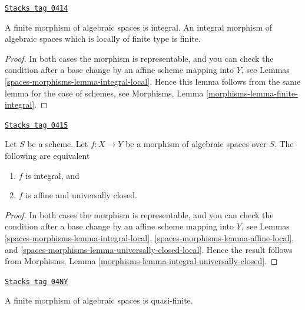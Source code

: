 \begin{lemma}
\label{spaces-morphisms-lemma-finite-integral}
\href{https://stacks.math.columbia.edu/tag/0414}{\texttt{Stacks tag 0414}}

A finite morphism of algebraic spaces is integral.
An integral morphism of algebraic spaces
which is locally of finite type is finite.
\end{lemma}

\begin{proof}
In both cases the morphism is representable, and you can check the condition
after a base change by an affine scheme mapping into $Y$, see
Lemmas \ref{spaces-morphisms-lemma-integral-local}. Hence this lemma follows from the
same lemma for the case of schemes, see
Morphisms, Lemma \ref{morphisms-lemma-finite-integral}.
\end{proof}

\begin{lemma}
\label{spaces-morphisms-lemma-integral-universally-closed}
\href{https://stacks.math.columbia.edu/tag/0415}{\texttt{Stacks tag 0415}}

Let $S$ be a scheme.
Let $f : X \to Y$ be a morphism of algebraic spaces over $S$.
The following are equivalent
\begin{enumerate}
\item $f$ is integral, and
\item $f$ is affine and universally closed.
\end{enumerate}
\end{lemma}

\begin{proof}
In both cases the morphism is representable, and you can check the condition
after a base change by an affine scheme mapping into $Y$, see
Lemmas \ref{spaces-morphisms-lemma-integral-local},
\ref{spaces-morphisms-lemma-affine-local}, and
\ref{spaces-morphisms-lemma-universally-closed-local}.
Hence the result follows from
Morphisms, Lemma \ref{morphisms-lemma-integral-universally-closed}.
\end{proof}

\begin{lemma}
\label{spaces-morphisms-lemma-finite-quasi-finite}
\href{https://stacks.math.columbia.edu/tag/04NY}{\texttt{Stacks tag 04NY}}

A finite morphism of algebraic spaces is quasi-finite.
\end{lemma}

